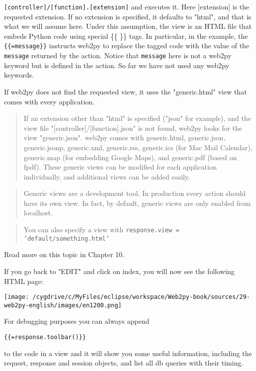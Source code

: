 \documentclass[justified,sixbynine,notoc]{tufte-book}
\def\ft{\small\tt}
\def\inxx#1{\index{#1}}
\begin{document}
\begin{fullwidth}
{\ft [controller]/[function].[extension]}
\noindent and executes it. Here [extension] is the requested extension. If no extension is specified, it defaults to "html", and that is what we will assume here. Under this assumption, the view is an HTML file that embeds Python code using special \{\{ \}\} tags. In particular, in the example, the {\ft \{\{=message\}\}} instructs web2py to replace the tagged code with the value of the {\ft message} returned by the action. Notice that {\ft message} here is not a web2py keyword but is defined in the action. So far we have not used any web2py keywords.

If web2py does not find the requested view, it uses the "generic.html" view that comes with every application.

\begin{quote}\inxx{Mac Mail} \inxx{Google Maps} \inxx{jsonp}
If an extension other than "html" is specified ("json" for example), and the view file "[controller]/[function].json" is not found, web2py looks for the view "generic.json". web2py comes with generic.html, generic.json, generic.jsonp, generic.xml, generic.rss, generic.ics (for Mac Mail Calendar), generic.map (for embedding Google Maps), and generic.pdf (based on fpdf). These generic views can be modified for each application individually, and additional views can be added easily.\end{quote}
\begin{quote}Generic views are a development tool. In production every action should have its own view. In fact, by default, generic views are only enabled from localhost.\end{quote}
\begin{quote}You can also specify a view with {\ft response.view = 'default/something.html'}\end{quote}
Read more on this topic in Chapter 10.

If you go back to "EDIT" and click on index, you will now see the following HTML page:


\goodbreak\begin{center}\texttt{[image: /cygdrive/c/MyFiles/eclipse/workspace/Web2py-book/sources/29-web2py-english/images/en1200.png]}\end{center}


For debugging purposes you can always append

\begin{lstlisting}[keywords={}]
{{=response.toolbar()}}
\end{lstlisting}
\noindent to the code in a view and it will show you some useful information, including the request, response and session objects, and list all db queries with their timing.


\end{fullwidth}
\end{document}
